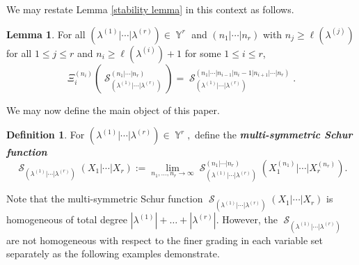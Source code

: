 \documentclass[12pt,reqno]{amsart}
\theoremstyle{definition}
\newtheorem{lem}[thm]{Lemma}
\newtheorem{defn}[thm]{Definition}
\DeclareMathOperator{\Par}{\mathbb{Y}}
\DeclareMathOperator{\cS}{\mathcal{S}}
\begin{document}
We may restate Lemma \ref{stability lemma} in this context as follows.

\begin{lem}\label{mutlisym stability lemma}
    For all $(\lambda^{(1)}|\cdots |\lambda^{(r)}) \in \Par^r$ and $(n_1|\cdots|n_r)$ with $n_j \geq \ell(\lambda^{(j)})$ for all $1\leq j \leq r$ and $n_i \geq \ell(\lambda^{(i)})+1$ for some $1 \leq i \leq r$, 
    $$\Xi_{i}^{(n_i)}\left(\cS_{(\lambda^{(1)}|\cdots |\lambda^{(r)})}^{(n_1|\cdots|n_r)} \right) = \cS_{(\lambda^{(1)}|\cdots |\lambda^{(r)})}^{(n_1|\cdots|n_{i-1}|n_i-1|n_{i+1}|\cdots|n_r)}.$$ 
\end{lem}


We may now define the main object of this paper.

\begin{defn}\label{multi-sym Schur function defn}
    For $(\lambda^{(1)}|\cdots |\lambda^{(r)}) \in \Par^r,$ define the \textbf{\textit{multi-symmetric Schur function}} 
    $$\cS_{(\lambda^{(1)}|\cdots |\lambda^{(r)})}(X_1 | \cdots |X_r) := \lim_{n_1,\ldots,n_r \rightarrow \infty} \cS_{(\lambda^{(1)}|\cdots |\lambda^{(r)})}^{(n_1|\cdots|n_r)}(X_{1}^{(n_1)} | \cdots |X_{r}^{(n_r)}).$$
\end{defn}

Note that the multi-symmetric Schur function $\cS_{(\lambda^{(1)}|\cdots |\lambda^{(r)})}(X_1 | \cdots |X_r)$ is homogeneous of total degree $|\lambda^{(1)}|+\ldots + |\lambda^{(r)}|.$ However, the $\cS_{(\lambda^{(1)}|\cdots |\lambda^{(r)})}$ are not homogeneous with respect to the finer grading in each variable set separately as the following examples demonstrate. 
\end{document}
